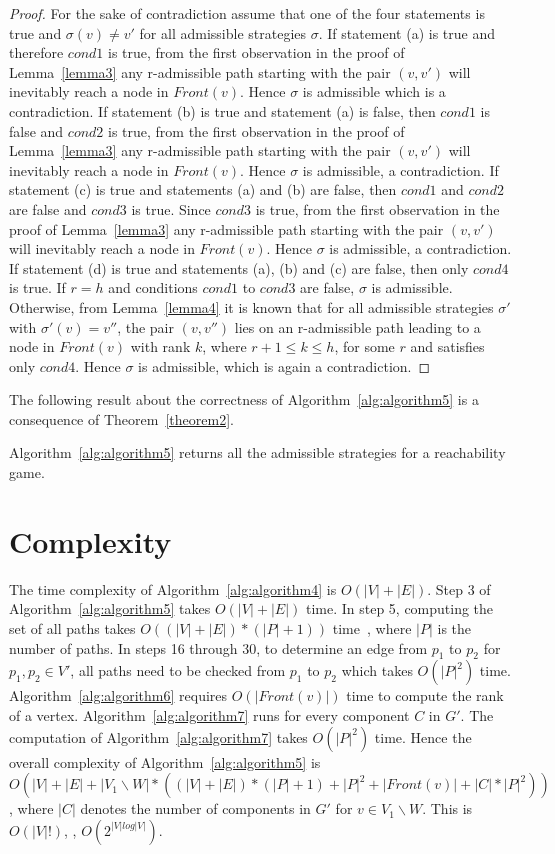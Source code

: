 \begin{proof}
	\newline For the sake of contradiction assume that one of the four statements is true and $\sigma(v) \neq v'$ for all admissible strategies $\sigma$. If statement (a) is true and therefore $cond1$ is true, from the first observation in the proof of Lemma~\ref{lemma3} any r-admissible path starting with the pair $(v,v')$ will inevitably reach a node in $\mathit{Front}(v)$. Hence $\sigma$ is admissible which is a contradiction. If statement (b) is true and statement (a) is false, then $cond1$ is false and $cond2$ is true, from the first observation in the proof of Lemma~\ref{lemma3} any r-admissible path starting with the pair $(v,v')$ will inevitably reach a node in $\mathit{Front}(v)$. Hence $\sigma$ is admissible, a contradiction. If statement (c) is true and statements (a) and (b) are false, then $cond1$ and $cond2$ are false and $cond3$ is true. Since $cond3$ is true, from the first observation in the proof of Lemma~\ref{lemma3} any r-admissible path starting with the pair $(v,v')$ will inevitably reach a node in $\mathit{Front}(v)$. Hence $\sigma$ is admissible, a contradiction. If statement (d) is true and statements (a), (b) and (c) are false, then only $cond4$ is true. If $r = h$ and conditions $cond1$ to $cond3$ are false, $\sigma$ is admissible. Otherwise, from Lemma~\ref{lemma4} it is known that for all admissible strategies $\sigma'$ with $\sigma'(v) = v''$, the pair $(v,v'')$ lies on an r-admissible path leading to a node in $\mathit{Front}(v)$ with rank $k$, where $r+1 \leq k \leq h$, for some $r$ and satisfies only $cond4$. Hence $\sigma$ is admissible, which is again a contradiction. 
\end{proof}

The following result about the correctness of Algorithm~\ref{alg:algorithm5} is a consequence of Theorem~\ref{theorem2}.

\begin{corollary}
	\label{corollary2}
	Algorithm~\ref{alg:algorithm5} returns all the admissible strategies for a reachability game.
\end{corollary}

\section{Complexity}
The time complexity of Algorithm~\ref{alg:algorithm4} is $O(|V| +
|E|)$. Step 3 of Algorithm~\ref{alg:algorithm5} takes $O(|V| + |E|)$
time. In step 5, computing the set of all paths takes
$O((|V|+|E|)*(|P|+1))$ time~\cite{ElementaryCircuits}, where $|P|$ is
the number of paths. In steps 16 through 30, to determine an edge from
$p_{1}$ to $p_{2}$ for $p_{1}, p_{2} \in V'$, all paths need to be checked from $p_{1}$ to $p_{2}$ which takes $O(|P|^{2})$
time. Algorithm~\ref{alg:algorithm6} requires $O(|\mathit{Front}(v)|)$
time to compute the rank of a vertex. Algorithm~\ref{alg:algorithm7}
runs for every component $C$ in $G'$. The computation of
Algorithm~\ref{alg:algorithm7} takes $O(|P|^{2})$ time. Hence the
overall complexity of Algorithm~\ref{alg:algorithm5} is $O(|V| + |E| +
|V_{1} \backslash W|*((|V|+|E|)*(|P|+1) + |P|^{2} +
|\mathit{Front}(v)| + |C|*|P|^{2}))$, where $|C|$ denotes the number
of components in $G'$ for $v \in V_{1} \backslash W$. This is
$O(|V|!)$, \ie, $O(2^{|V|log|V|})$.
